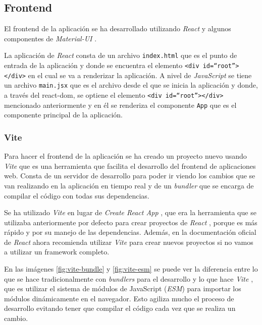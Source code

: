 \subsection{Frontend}

El frontend de la aplicación se ha desarrollado utilizando \textit{React} \cite{react}
y algunos componentes de \textit{Material-UI} \cite{material-ui}.

La aplicación de \textit{React} \cite{react} consta de un archivo \texttt{index.html}
que es el punto de entrada de la aplicación y donde se encuentra el elemento
\texttt{<div id=``root''></div>} en el cual se va a renderizar la aplicación. A nivel de
\textit{JavaScript} se tiene un archivo \texttt{main.jsx} que es el archivo desde el que
se inicia la aplicación y donde, a través del react-dom, se optiene el elemento
\texttt{<div id=``root''></div>} mencionado anteriormente y en él se renderiza el componente
\texttt{App} que es el componente principal de la aplicación.

\subsubsection{Vite}

Para hacer el frontend de la aplicación se ha creado un proyecto nuevo usando
\textit{Vite} \cite{vite} que es una herramienta que facilita el desarrollo del frontend
de aplicaciones web. Consta de un servidor de desarrollo para poder ir viendo los cambios
que se van realizando en la aplicación en tiempo real y de un \textit{bundler} que se
encarga de compilar el código con todas sus dependencias.

Se ha utilizado \textit{Vite} \cite{vite} en lugar de \textit{Create React App}
\cite{create-react-app}, que era la herramienta que se utilizaba anteriormente por defecto
para crear proyectos de \textit{React} \cite{react}, porque es más rápido y por su
manejo de las dependencias. Además, en la documentación oficial de \textit{React}
\cite{start-react-project} ahora recomienda utilizar \textit{Vite} \cite{vite} para crear
nuevos proyectos si no vamos a utilizar un framework completo.

En las imágenes \ref{fig:vite-bundle} y \ref{fig:vite-esm} \cite{why-vite} se puede ver la
diferencia entre lo que se hace tradicionalmente con \textit{bundlers} para el desarrollo y
lo que hace \textit{Vite} \cite{vite}, que es utilizar el sistema de módulos de JavaScript
(\textit{ESM}) \cite{esm} para importar los módulos dinámicamente en el navegador. Esto
agiliza mucho el proceso de desarrollo evitando tener que compilar el código cada vez que
se realiza un cambio.

